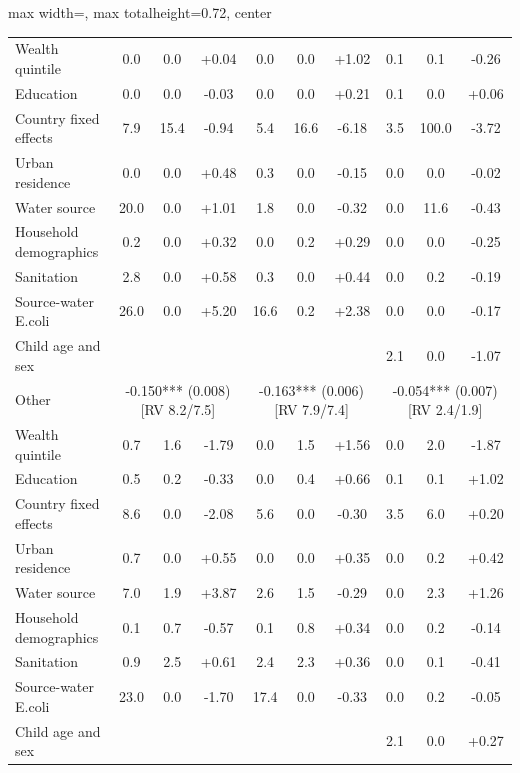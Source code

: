 \begin{landscape}
\begin{table}[p]
\begin{adjustbox}{max width=\linewidth, max totalheight=0.72\textwidth, center}
\begin{tabular}{l|ccc|ccc|ccc}
\quad Wealth quintile & 0.0 & 0.0 & +0.04 & 0.0 & 0.0 & +1.02 & 0.1 & 0.1 & -0.26 \\
\quad Education & 0.0 & 0.0 & -0.03 & 0.0 & 0.0 & +0.21 & 0.1 & 0.0 & +0.06 \\
\quad Country fixed effects & 7.9 & 15.4 & -0.94 & 5.4 & 16.6 & -6.18 & 3.5 & 100.0 & -3.72 \\
\quad Urban residence & 0.0 & 0.0 & +0.48 & 0.3 & 0.0 & -0.15 & 0.0 & 0.0 & -0.02 \\
\quad Water source & 20.0 & 0.0 & +1.01 & 1.8 & 0.0 & -0.32 & 0.0 & 11.6 & -0.43 \\
\quad Household demographics & 0.2 & 0.0 & +0.32 & 0.0 & 0.2 & +0.29 & 0.0 & 0.0 & -0.25 \\
\quad Sanitation & 2.8 & 0.0 & +0.58 & 0.3 & 0.0 & +0.44 & 0.0 & 0.2 & -0.19 \\
\quad Source-water E.coli & 26.0 & 0.0 & +5.20 & 16.6 & 0.2 & +2.38 & 0.0 & 0.0 & -0.17 \\
\quad Child age and sex &  &  &  &  &  &  & 2.1 & 0.0 & -1.07 \\
\midrule
Other & \multicolumn{3}{c}{-0.150*** (0.008) {\scriptsize[RV 8.2/7.5]}} & \multicolumn{3}{c}{-0.163*** (0.006) {\scriptsize[RV 7.9/7.4]}} & \multicolumn{3}{c}{-0.054*** (0.007) {\scriptsize[RV 2.4/1.9]}} \\
\quad Wealth quintile & 0.7 & 1.6 & -1.79 & 0.0 & 1.5 & +1.56 & 0.0 & 2.0 & -1.87 \\
\quad Education & 0.5 & 0.2 & -0.33 & 0.0 & 0.4 & +0.66 & 0.1 & 0.1 & +1.02 \\
\quad Country fixed effects & 8.6 & 0.0 & -2.08 & 5.6 & 0.0 & -0.30 & 3.5 & 6.0 & +0.20 \\
\quad Urban residence & 0.7 & 0.0 & +0.55 & 0.0 & 0.0 & +0.35 & 0.0 & 0.2 & +0.42 \\
\quad Water source & 7.0 & 1.9 & +3.87 & 2.6 & 1.5 & -0.29 & 0.0 & 2.3 & +1.26 \\
\quad Household demographics & 0.1 & 0.7 & -0.57 & 0.1 & 0.8 & +0.34 & 0.0 & 0.2 & -0.14 \\
\quad Sanitation & 0.9 & 2.5 & +0.61 & 2.4 & 2.3 & +0.36 & 0.0 & 0.1 & -0.41 \\
\quad Source-water E.coli & 23.0 & 0.0 & -1.70 & 17.4 & 0.0 & -0.33 & 0.0 & 0.2 & -0.05 \\
\quad Child age and sex &  &  &  &  &  &  & 2.1 & 0.0 & +0.27 \\
\bottomrule
\end{tabular}
\end{adjustbox}

\end{table}
\end{landscape}
